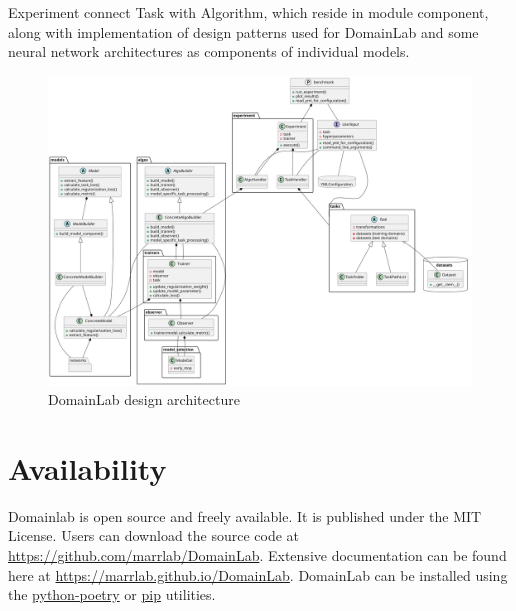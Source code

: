 Experiment connect Task with Algorithm, which reside in module
component, along with implementation of design patterns used for
DomainLab and some neural network architectures as components of
individual models.

\begin{figure}
\centering
\includegraphics{../docs/libDG}
\caption{DomainLab design architecture~\label{fig:cdiagram}}
\end{figure}

\hypertarget{availability}{%
\section{Availability}\label{availability}}

Domainlab is open source and freely available. It is published under the
MIT License. Users can download the source code at
\url{https://github.com/marrlab/DomainLab}. Extensive documentation can
be found here at \url{https://marrlab.github.io/DomainLab}. DomainLab
can be installed using the
\href{https://python-poetry.org/}{python-poetry} or
\href{https://pypi.org/project/pip/}{pip} utilities.

